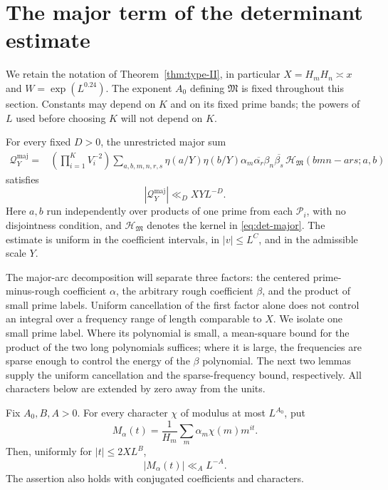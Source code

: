 \section{The major term of the determinant estimate}\label{sec:major-arcs}\label{maj:section}

We retain the notation of Theorem~\ref{thm:type-II}, in particular
$X=H_mH_n\asymp x$ and $W=\exp(L^{0.24})$.  The exponent $A_0$
defining $\mathfrak M$ is fixed throughout this section.  Constants may
depend on $K$ and on its fixed prime bands; the powers of $L$ used before
choosing $K$ will not depend on $K$.

\begin{proposition}\label{prop:major-term}
For every fixed $D>0$, the unrestricted major sum
\begin{equation}\label{maj:sum}
 \begin{split}
 \mathcal Q_Y^{\mathrm{maj}}={}&
 \left(\prod_{i=1}^K V_i^{-2}\right)
 \sum_{a,b,m,n,r,s}
 \eta(a/Y)\eta(b/Y)\alpha_m\overline{\alpha_r}
       \beta_n\overline{\beta_s}\,
 \mathcal H_{\mathfrak M}(bmn-ars;a,b)
 \end{split}
\end{equation}
satisfies
\begin{equation}\label{maj:bound}
 |\mathcal Q_Y^{\mathrm{maj}}|\ll_D XYL^{-D}.
\end{equation}
Here $a,b$ run independently over products of one prime from each
$\mathcal P_i$, with no disjointness condition, and
$\mathcal H_{\mathfrak M}$ denotes the kernel in
\eqref{eq:det-major}.  The estimate is uniform in the coefficient
intervals, in $|v|\le L^C$, and in the admissible scale $Y$.
\end{proposition}

The major-arc decomposition will separate three factors: the centered
prime-minus-rough coefficient $\alpha$, the arbitrary rough coefficient
$\beta$, and the product of small prime labels. Uniform cancellation
of the first factor alone does not control an integral over a frequency
range of length comparable to $X$. We isolate one small prime label.
Where its polynomial is small, a mean-square bound for the product of
the two long polynomials suffices; where it is large, the frequencies
are sparse enough to control the
energy of the $\beta$ polynomial. The next two lemmas supply the
uniform cancellation and the sparse-frequency bound, respectively.
All characters below are extended by zero away from the units.

\begin{lemma}\label{maj:long-coefficient}
Fix $A_0,B,A>0$.  For every character $\chi$ of modulus at most
$L^{A_0}$, put
\begin{equation}\label{maj:M-definition}
 M_\alpha(t)=\frac1{H_m}\sum_m\alpha_m\chi(m)m^{it}.
\end{equation}
Then, uniformly for $|t|\le 2XL^B$,
\begin{equation}\label{maj:M-uniform}
 |M_\alpha(t)|\ll_A L^{-A}.
\end{equation}
The assertion also holds with conjugated coefficients and characters.
\end{lemma}

